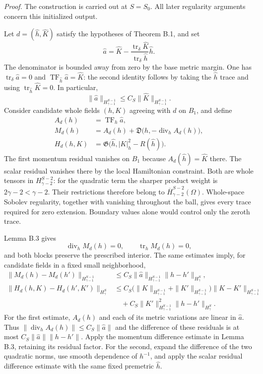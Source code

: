 \documentclass[
  english,
  11pt,
  reqno]{amsart}
\begin{document}
\emph{Proof.} The construction is carried out at \(S=S_0\). All later
regularity arguments concern this initialized output.

Let \(d=(\widehat h,\widehat K)\) satisfy the hypotheses of Theorem B.1,
and set%
 \[
\widehat a=\widehat K-
\frac{\operatorname{tr}_\delta\widehat K}
{\operatorname{tr}_\delta\widehat h}\widehat h.
\] The denominator is bounded away from zero by the base metric margin.
One has \(\operatorname{tr}_\delta \widehat a=0\) and
\(\operatorname{TF}_{\widehat h}\widehat a=\widehat K\): the second
identity follows by taking the \(\widehat h\) trace and using
\(\operatorname{tr}_{\widehat h}\widehat K=0\). In particular, \[
\|\widehat a\|_{H^{S-1}_{\gamma-1}}
\le C_S\|\widehat K\|_{H^{S-1}_{\gamma-1}}.
\] Consider candidate whole fields \((h,K)\) agreeing with \(d\) on
\(B_1\), and define%
 \[
\begin{aligned}
A_d(h)&=\operatorname{TF}_h \widehat a,\\
M_d(h)&=A_d(h)+
\mathfrak D\bigl(h,-\operatorname{div}_hA_d(h)\bigr),\\
H_d(h,K)&=\mathfrak G\bigl(
\widehat h,|K|_h^2-R(\widehat h)\bigr).
\end{aligned}
\] The first momentum residual vanishes on \(B_1\) because
\(A_d(\widehat h)=\widehat K\) there. The scalar residual vanishes there
by the local Hamiltonian constraint. Both are whole tensors in
\(H^{S-2}_{\gamma-2}\): for the quadratic term the sharper product
weight is \(2\gamma-2<\gamma-2\). Their restrictions therefore belong to
\(\overline H^{S-2}_{\gamma-2}(\Omega)\). Whole-space Sobolev
regularity, together with vanishing throughout the ball, gives every
trace required for zero extension. Boundary values alone would control
only the zeroth trace.

Lemma B.3 gives \[
\operatorname{div}_hM_d(h)=0,\qquad
\operatorname{tr}_hM_d(h)=0,
\] and both blocks preserve the prescribed interior. The same estimates
imply, for candidate fields in a fixed small neighborhood, \[
\begin{aligned}
\|M_d(h)-M_d(h')\|_{H^{S-1}_{\gamma-1}}
&\le C_S\|\widehat a\|_{H^{S-1}_{\gamma-1}}
\|h-h'\|_{H^S_\gamma},\\
\|H_d(h,K)-H_d(h',K')\|_{H^S_\gamma}
&\le C_S\bigl(\|K\|_{H^{S-1}_{\gamma-1}}+
\|K'\|_{H^{S-1}_{\gamma-1}}\bigr)
\|K-K'\|_{H^{S-1}_{\gamma-1}}\\
&\quad+C_S\|K'\|_{H^{S-1}_{\gamma-1}}^2
\|h-h'\|_{H^S_\gamma}.
\end{aligned}
\] For the first estimate, \(A_d(h)\) and each of its metric variations
are linear in \(\widehat a\). Thus
\(\|\operatorname{div}_hA_d(h)\|\le C_S\|\widehat a\|\) and the
difference of these residuals is at most \(C_S\|\widehat a\|\|h-h'\|\).
Apply the momentum difference estimate in Lemma B.3, retaining its
residual factor. For the second, expand the difference of the two
quadratic norms, use smooth dependence of \(h^{-1}\), and apply the
scalar residual difference estimate with the same fixed premetric
\(\widehat h\).
\end{document}
